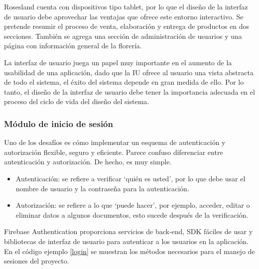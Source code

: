 Rosesland cuenta con dispositivos tipo \gls{tablet}, por lo que el diseño de la interfaz de usuario debe aprovechar las ventajas que ofrece este entorno interactivo. Se pretende resumir el proceso de venta, elaboración y entrega de productos en dos secciones. También se agrega una sección de administración de usuarios y una página con información general de la florería.
\vspace{0.8cm}

La interfaz de usuario juega un papel muy importante en el aumento de la usabilidad de una aplicación, dado que la IU ofrece al usuario una vista abstracta de todo el sistema, el éxito del sistema depende en gran medida de ello. Por lo tanto, el diseño de la interfaz de usuario debe tener la importancia adecuada en el proceso del ciclo de vida del diseño del sistema.
\vspace{0.8cm}

\subsubsection{Módulo de inicio de sesión}
Uno de los desafíos es cómo implementar un esquema de autenticación y autorización flexible, seguro y eficiente. Parece confuso diferenciar entre autenticación y autorización. De hecho, es muy simple.

\begin{itemize}
  \item Autenticación: se refiere a verificar `quién es usted', por lo que debe usar el nombre de usuario y la contraseña para la autenticación.

  \item Autorización: se refiere a lo que `puede hacer', por ejemplo, acceder, editar o eliminar datos a algunos documentos, esto sucede después de la verificación.
\end{itemize}

Firebase Authentication proporciona servicios de back-end, SDK fáciles de usar y bibliotecas de interfaz de usuario para autenticar a los usuarios en la aplicación. En el código ejemplo \ref{login} se muestran los métodos necesarios para el manejo de sesiones del proyecto.
\vspace{0.8cm}

